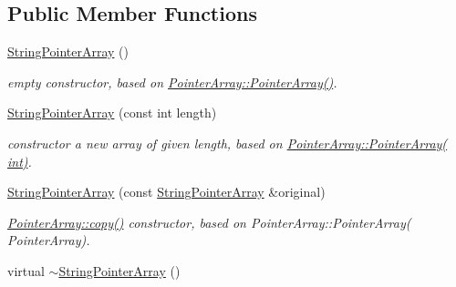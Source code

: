 \subsection*{Public Member Functions}
\begin{DoxyCompactItemize}
\item 
\hypertarget{classplist_1_1StringPointerArray_a377399f1256d67b4c9c1a663c31439f2}{\hyperlink{classplist_1_1StringPointerArray_a377399f1256d67b4c9c1a663c31439f2}{String\-Pointer\-Array} ()}\label{classplist_1_1StringPointerArray_a377399f1256d67b4c9c1a663c31439f2}

\begin{DoxyCompactList}\small\item\em empty constructor, based on \hyperlink{classplist_1_1PointerArray_a8695d3709a6db7a3de08c9f28881d93b}{Pointer\-Array\-::\-Pointer\-Array()}. \end{DoxyCompactList}\item 
\hypertarget{classplist_1_1StringPointerArray_aaa5eec71c22cf29a336eb54016089830}{\hyperlink{classplist_1_1StringPointerArray_aaa5eec71c22cf29a336eb54016089830}{String\-Pointer\-Array} (const int length)}\label{classplist_1_1StringPointerArray_aaa5eec71c22cf29a336eb54016089830}

\begin{DoxyCompactList}\small\item\em constructor a new array of given length, based on \hyperlink{classplist_1_1PointerArray_a6f9ce497535e0ccf4572631d76f5a561}{Pointer\-Array\-::\-Pointer\-Array( int)}. \end{DoxyCompactList}\item 
\hypertarget{classplist_1_1StringPointerArray_a6f003b9553754531de6013ced8715fb2}{\hyperlink{classplist_1_1StringPointerArray_a6f003b9553754531de6013ced8715fb2}{String\-Pointer\-Array} (const \hyperlink{classplist_1_1StringPointerArray}{String\-Pointer\-Array} \&original)}\label{classplist_1_1StringPointerArray_a6f003b9553754531de6013ced8715fb2}

\begin{DoxyCompactList}\small\item\em \hyperlink{classplist_1_1PointerArray_a02260685c3904a903dafabe72b03b0c1}{Pointer\-Array\-::copy()} constructor, based on Pointer\-Array\-::\-Pointer\-Array( Pointer\-Array). \end{DoxyCompactList}\item 
\hypertarget{classplist_1_1StringPointerArray_a00ff8356a7f25d0375ce7a28906b3bc4}{virtual \hyperlink{classplist_1_1StringPointerArray_a00ff8356a7f25d0375ce7a28906b3bc4}{$\sim$\-String\-Pointer\-Array} ()}\label{classplist_1_1StringPointerArray_a00ff8356a7f25d0375ce7a28906b3bc4}


\end{DoxyCompactItemize}
